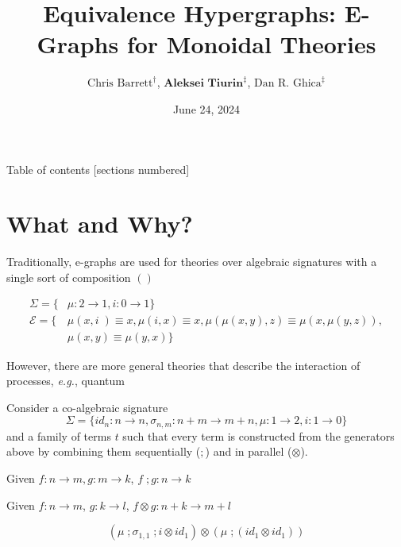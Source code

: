 \documentclass[aspectratio=169]{beamer}
\title{Equivalence Hypergraphs: E-Graphs for Monoidal Theories}
\date{June 24, 2024} %
\author[Aleksei Tiurin]{$\text{Chris Barrett}^{\dagger}$, $\textbf{Aleksei Tiurin}^{\ddagger}$, $\text{Dan R. Ghica}^{\ddagger}$}
\institute{$^{\dagger}$University of Oxford, $^{\ddagger}$University of Birmingham}
\begin{document}
 

\maketitle 

\begin{frame}{Table of contents}
    [sections numbered]
    \tableofcontents[hideallsubsections]
\end{frame}

\section{What and Why?} 

\begin{frame}
    Traditionally, e-graphs are used for \alert{theories} over \alert{algebraic} signatures with a single sort of composition $()$

    \begin{example}
    
    \begin{align*}
    \Sigma = \{&\mu : 2 \to 1, i : 0 \to 1\}\\
    \mathcal{E} = \{&\mu(x,i\;) \equiv x, \mu(i,x) \equiv x,
     \mu(\mu(x,y),z) \equiv \mu(x,\mu(y,z)),\\
    &\mu(x,y) \equiv \mu(y,x)\}    
    \end{align*}
    \end{example}

    However, there are more general theories that describe the interaction of processes, \textit{e.g.}, quantum
\end{frame}

\begin{frame}{}
    
Consider a \alert{co-algebraic} signature 
\[
\Sigma = \{id_n : n \to n,\sigma_{n,m} : n + m \to m + n,\mu : 1 \to 2, i : 1 \to 0\}
\]
and a family of terms $t$ such that every term is constructed from the generators above by combining them sequentially ($;$) and in parallel ($\otimes$).

Given $f : n \to m, g : m \to k$, $f\;;g : n \to k$

Given $f : n \to m$, $g : k \to l$, $f \otimes g : n + k \to m + l$

\begin{example}
    \[
    (\mu\;;\sigma_{1,1}\;;i \otimes id_{1}) \otimes (\mu\;;(id_{1}\otimes id_{1}))
    \]
\end{example}

\end{frame}
\end{document}
